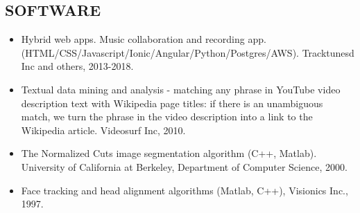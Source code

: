 \documentclass[conference,lettersize,twocolumn,twosize]{./IEEEtran}
\begin{document}
\subsection*{SOFTWARE}
\begin{itemize}
\item{Hybrid web apps. Music collaboration and recording
  app. (HTML/CSS/Javascript/Ionic/Angular/Python/Postgres/AWS).
  Tracktunesd Inc and others, 2013-2018.}
\item{Textual data mining and analysis - matching any phrase in
  YouTube video description text with Wikipedia page titles: if there
  is an unambiguous match, we turn the phrase in the video description
  into a link to the Wikipedia article. Videosurf Inc, 2010.}
\item{The Normalized Cuts image segmentation algorithm (C++, Matlab).
  University of California at Berkeley, Department of Computer
  Science, 2000.}
\item{Face tracking and head alignment algorithms (Matlab, C++),
  Visionics Inc., 1997.}
\end{itemize}
\end{document}
